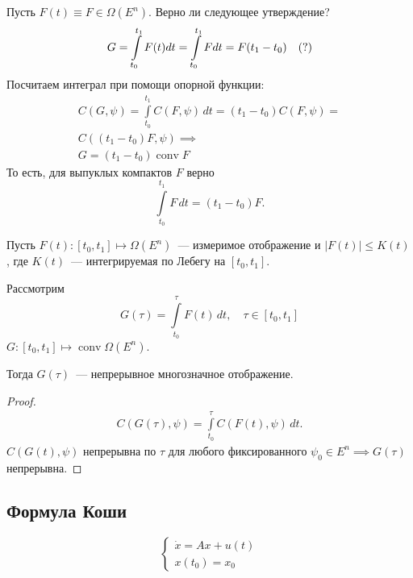 Пусть $F(t) \equiv F \in \Omega(E^{n})$.
Верно ли следующее утверждение?
\begin{equation*}
    G = \int\limits_{t_0}^{t_1} F(t) dt = \int\limits_{t_0}^{t_1} F dt = F (t_1 - t_0) \quad (?)\\
\end{equation*}
Посчитаем интеграл при помощи опорной функции:
\begin{gather*}
    C(G, \psi) = \int\limits_{t_0}^{t_1} C(F, \psi) \, dt = (t_1 - t_0) C(F, \psi) = \\
    C((t_1 - t_0)F, \psi) \implies \\
    G = (t_1 - t_0) \operatorname{conv} F
\end{gather*}
То есть, для выпуклых компактов $F$ верно
\begin{equation*}
    \int\limits_{t_0}^{t_1} F \, dt = 
    (t_1 - t_0) F.
\end{equation*}

\begin{thm*}
    Пусть $F(t)\colon [t_0, t_1] \mapsto \Omega(E^n)$~--- измеримое отображение и
    $|F(t)| \leqslant K(t)$, где $K(t)$~--- интегрируемая по Лебегу на $[t_0, t_1]$.

    Рассмотрим 
    \begin{equation*}
        G(\tau) = \int\limits_{t_0}^{\tau} F(t) \, dt, \quad \tau \in [t_0, t_1]
    \end{equation*}
    $G\colon [t_0, t_1] \mapsto \operatorname{conv}\Omega(E^{n})$.

    Тогда $G(\tau)$~--- непрерывное многозначное отображение.
\end{thm*}
\begin{proof}
    \begin{gather*}
        C(G(\tau), \psi) = 
        \int\limits_{t_0}^{\tau} C(F(t), \psi) \, dt. 
    \end{gather*}
    $C(G(t), \psi)$ непрерывна по $\tau$ для любого фиксированного $\psi_0 \in E^n \implies G(\tau)$ непрерывна.
\end{proof}

\subsection{Формула Коши}

\begin{equation*}
    \begin{cases}
        \dot{x} = Ax + u(t) \\
        x(t_0) = x_0
    \end{cases}
\end{equation*}

